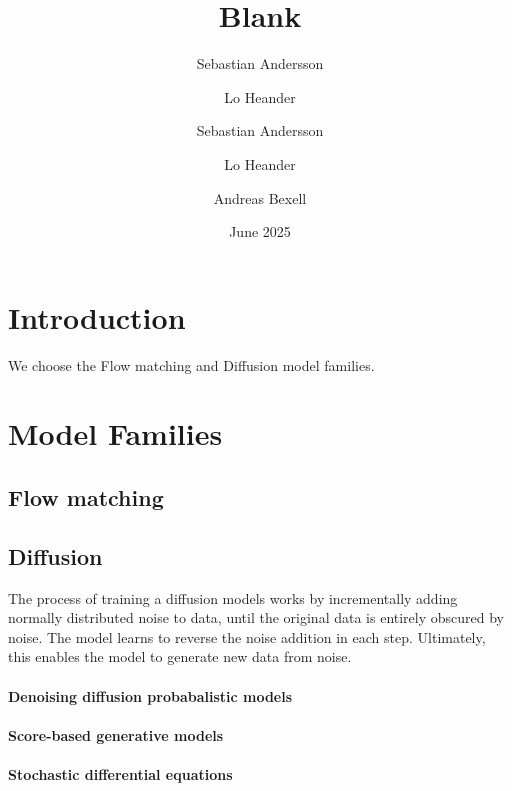 \documentclass{article}
\title{Blank}
\author{Sebastian Andersson}
\author{Lo Heander}
\author{Sebastian Andersson \and Lo Heander \and Andreas Bexell}
\date{June 2025}
\begin{document}
\maketitle

\section{Introduction}

We choose the Flow matching and Diffusion model families. 

\section{Model Families}

\subsection{Flow matching}

\subsection{Diffusion}

The process of training a diffusion models works by incrementally adding normally distributed noise to data, until the original data is entirely obscured by noise.
The model learns to reverse the noise addition in each step. Ultimately, this enables the model to generate new data from noise.

\paragraph{Denoising diffusion probabalistic models}

\paragraph{Score-based generative models}

\paragraph{Stochastic differential equations}
\end{document}
